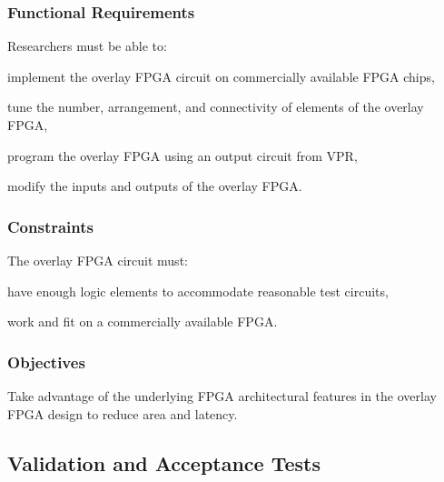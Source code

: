 \subsubsection{Functional Requirements}

Researchers must be able to:
\begin{itemlist}
\item implement the overlay FPGA circuit on commercially available FPGA chips,
\item tune the number, arrangement, and connectivity of elements of the overlay FPGA,
\item program the overlay FPGA using an output circuit from VPR,
\item modify the inputs and outputs of the overlay FPGA.
\end{itemlist}


\subsubsection{Constraints}

The overlay FPGA circuit must:
\begin{itemlist}
\item have enough logic elements to accommodate reasonable test circuits,
\item work and fit on a commercially available FPGA.
\end{itemlist}


\subsubsection{Objectives}

\begin{itemlist}
\item Take advantage of the underlying FPGA architectural features in the overlay FPGA design to reduce area and latency.
\end{itemlist}


\subsection{Validation and Acceptance Tests}


